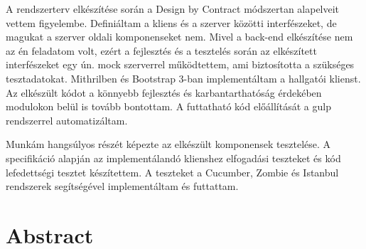 A rendszerterv elkészítése során a Design by Contract módszertan alapelveit vettem figyelembe. Definiáltam a kliens és a szerver közötti interfészeket, de magukat a szerver oldali komponenseket nem. Mivel a back-end elkészítése nem az én feladatom volt, ezért a fejlesztés és a tesztelés során az elkészített interfészeket egy ún. mock szerverrel működtettem, ami biztosította a szükséges tesztadatokat.
Mithrilben és Bootstrap 3-ban implementáltam a hallgatói klienst. Az elkészült kódot a könnyebb fejlesztés és karbantarthatóság érdekében modulokon belül is tovább bontottam. A futtatható kód előállítását a gulp rendszerrel automatizáltam.

Munkám hangsúlyos részét képezte az elkészült komponensek tesztelése. A specifikáció alapján az implementálandó klienshez elfogadási teszteket és kód lefedettségi tesztet készítettem. A teszteket a Cucumber, Zombie és Istanbul rendszerek segítségével implementáltam és futtattam.





\vfill
{}
\englishParagraph


\chapter*{Abstract}



\vfill
\dolgozatnyelve
{}

\setcounter{romanPage}{\value{page}}
